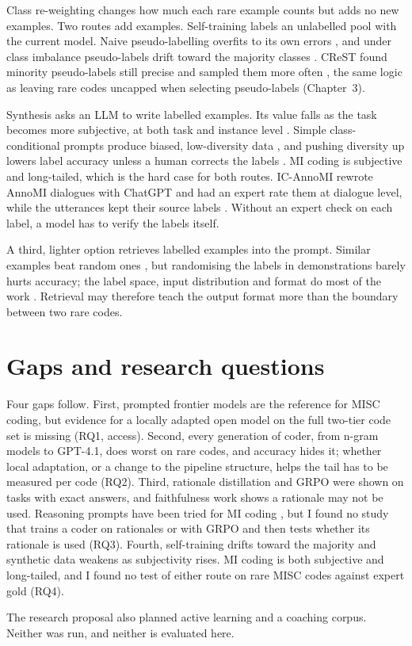 Class re-weighting \citep{cui2019class} changes how much each rare example counts but adds no new examples. Two routes add examples. Self-training labels an unlabelled pool with the current model. Naive pseudo-labelling overfits to its own errors \citep{arazo2020pseudo}, and under class imbalance pseudo-labels drift toward the majority classes \citep{he2021redistributing}. CReST found minority pseudo-labels still precise and sampled them more often \citep{wei2021crest}, the same logic as leaving rare codes uncapped when selecting pseudo-labels (Chapter~3).

Synthesis asks an LLM to write labelled examples. Its value falls as the task becomes more subjective, at both task and instance level \citep{li2023synthetic}. Simple class-conditional prompts produce biased, low-diversity data \citep{yu2023large}, and pushing diversity up lowers label accuracy unless a human corrects the labels \citep{chung2023increasing}. MI coding is subjective and long-tailed, which is the hard case for both routes. IC-AnnoMI rewrote AnnoMI dialogues with ChatGPT and had an expert rate them at dialogue level, while the utterances kept their source labels \citep{kumar2024unlocking}. Without an expert check on each label, a model has to verify the labels itself.

A third, lighter option retrieves labelled examples into the prompt. Similar examples beat random ones \citep{liu2022makes}, but randomising the labels in demonstrations barely hurts accuracy; the label space, input distribution and format do most of the work \citep{min2022rethinking}. Retrieval may therefore teach the output format more than the boundary between two rare codes.

\section{Gaps and research questions}
\label{sec:rw-gaps}

Four gaps follow. First, prompted frontier models are the reference for MISC coding, but evidence for a locally adapted open model on the full two-tier code set is missing (RQ1, access). Second, every generation of coder, from n-gram models to GPT-4.1, does worst on rare codes, and accuracy hides it; whether local adaptation, or a change to the pipeline structure, helps the tail has to be measured per code (RQ2). Third, rationale distillation and GRPO were shown on tasks with exact answers, and faithfulness work shows a rationale may not be used. Reasoning prompts have been tried for MI coding \citep{han2024chain}, but I found no study that trains a coder on rationales or with GRPO and then tests whether its rationale is used (RQ3). Fourth, self-training drifts toward the majority and synthetic data weakens as subjectivity rises. MI coding is both subjective and long-tailed, and I found no test of either route on rare MISC codes against expert gold (RQ4).

The research proposal also planned active learning and a coaching corpus. Neither was run, and neither is evaluated here.

